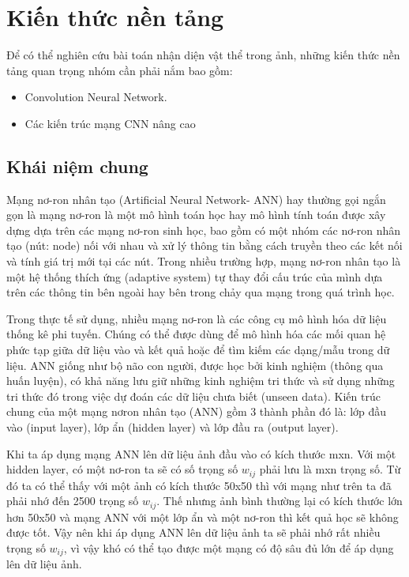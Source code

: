 \chapter{Kiến thức nền tảng}

Để có thể nghiên cứu bài toán nhận diện vật thể trong ảnh, những kiến thức nền tảng quan trọng nhóm cần phải nắm bao gồm:
\begin{itemize}
	\item Convolution Neural Network.
	\item Các kiến trúc mạng CNN nâng cao
\end{itemize}

\section{Khái niệm chung}

Mạng nơ-ron nhân tạo (Artificial Neural Network- ANN) hay thường gọi ngắn gọn là mạng nơ-ron là một mô hình toán học hay mô hình tính toán được xây dựng dựa trên các mạng nơ-ron sinh học, bao gồm có một nhóm các nơ-ron nhân tạo (nút: node) nối với nhau và xử lý thông tin bằng cách truyền theo các kết nối và tính giá trị mới tại các nút. Trong nhiều trường hợp, mạng nơ-ron nhân tạo là một hệ thống thích ứng (adaptive system) tự thay đổi cấu trúc của mình dựa trên các thông tin bên ngoài hay bên trong chảy qua mạng trong quá trình học.

	Trong thực tế sử dụng, nhiều mạng nơ-ron là các công cụ mô hình hóa dữ liệu thống kê phi tuyến. Chúng có thể được dùng để mô hình hóa các mối quan hệ phức tạp giữa dữ liệu vào và kết quả hoặc để tìm kiếm các dạng/mẫu trong dữ liệu. ANN giống như bộ não con người, được học bởi kinh nghiệm (thông qua huấn luyện), có khả năng lưu giữ những kinh nghiệm tri thức và sử dụng những tri thức đó trong việc dự đoán các dữ liệu chưa biết (unseen data). Kiến trúc chung của một mạng nơron nhân tạo (ANN) gồm 3 thành phần đó là: lớp đầu vào (input layer), lớp ẩn (hidden layer) và lớp đầu ra (output layer).

Khi ta áp dụng mạng ANN lên dữ liệu ảnh đầu vào có kích thước mxn. Với một hidden layer, có một nơ-ron ta sẽ có số trọng số $w_{ij}$ phải lưu là mxn trọng số. Từ đó ta có thể thấy với một ảnh có kích thước 50x50 thì với mạng như trên ta đã phải nhớ đến 2500 trọng số $w_{ij}$. Thế nhưng ảnh bình thường lại có kích thước lớn hơn 50x50 và mạng ANN với một lớp ẩn và một nơ-ron thì kết quả học sẽ không được tốt. Vậy nên khi áp dụng ANN lên dữ liệu ảnh ta sẽ phải nhớ rất nhiều trọng số $w_{ij}$, vì vậy khó có thể tạo được một mạng có độ sâu đủ lớn để áp dụng lên dữ liệu ảnh.

